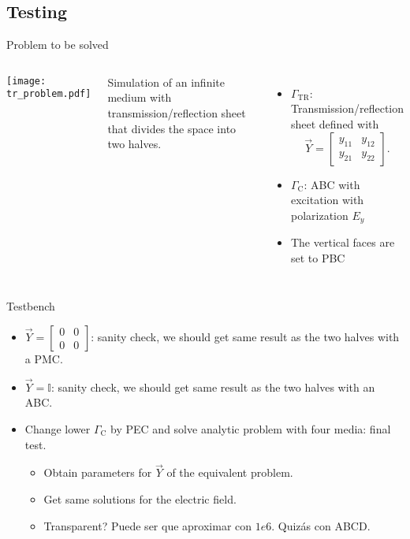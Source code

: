 \subsection{Testing}

\begin{frame}{Problem to be solved}
  \begin{columns}
     \centering
    {\texttt{[image: tr\_problem.pdf]}}
    {
      Simulation of an infinite medium with transmission/reflection sheet that divides the space into two halves.
      \begin{itemize}
        \item $\Gamma_\text{TR}$: Transmission/reflection sheet defined with 
        \begin{equation*}
          \vec{Y} = \begin{bmatrix}
            y_{11} & y_{12} \\
            y_{21} & y_{22}
          \end{bmatrix}.
        \end{equation*}
        \item $\Gamma_\text{C}$: ABC with excitation with polarization $E_y$
        \item The vertical faces are set to PBC
      \end{itemize} 
    }
  \end{columns}
\end{frame}

\begin{frame}{Testbench}
  \begin{itemize} 
    \item $\vec{Y} = \begin{bmatrix}
      0 & 0 \\
      0 & 0
    \end{bmatrix}$: sanity check, we should get same result as the two halves with a PMC.
    \item $\vec{Y} = \mathbb{I}$: sanity check, we should get same result as the two halves with an ABC.
    \item Change lower $\Gamma_\text{C}$ by PEC and solve analytic problem with four media: final test.
    \begin{itemize}
      \item Obtain parameters for $\vec{Y}$ of the equivalent problem.
      \item Get same solutions for the electric field.
      \item Transparent? Puede ser que aproximar con $1e6$. Quizás con ABCD.
    \end{itemize}
  \end{itemize}
\end{frame}

